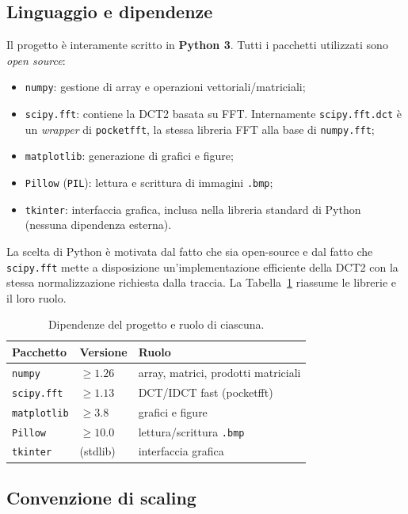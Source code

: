 \documentclass[11pt,a4paper]{article}
\begin{document}
\subsection{Linguaggio e dipendenze}\label{sec:intro}

Il progetto è interamente scritto in \textbf{Python 3}. Tutti i pacchetti
utilizzati sono \emph{open source}:
\begin{itemize}
  \item \texttt{numpy}: gestione di array e operazioni vettoriali/matriciali;
  \item \texttt{scipy.fft}: contiene la DCT2 basata su FFT. Internamente
        \texttt{scipy.fft.dct} è un \emph{wrapper} di \texttt{pocketfft}, la
        stessa libreria FFT alla base di \texttt{numpy.fft};
  \item \texttt{matplotlib}: generazione di grafici e figure;
  \item \texttt{Pillow} (\texttt{PIL}): lettura e scrittura di immagini
        \texttt{.bmp};
  \item \texttt{tkinter}: interfaccia grafica, inclusa nella libreria standard
        di Python (nessuna dipendenza esterna).
\end{itemize}

La scelta di Python è motivata dal fatto che sia open-source e dal fatto che
\texttt{scipy.fft} mette a disposizione un'implementazione efficiente della DCT2
con la stessa normalizzazione richiesta dalla traccia. La
Tabella~\ref{tab:dipendenze} riassume le librerie e il loro ruolo.

\begin{table}[H]
\centering
\caption{Dipendenze del progetto e ruolo di ciascuna.}
\label{tab:dipendenze}
\begin{tabular}{lll}
\toprule
Pacchetto & Versione & Ruolo \\
\midrule
\texttt{numpy}      & $\ge 1.26$ & array, matrici, prodotti matriciali \\
\texttt{scipy.fft}  & $\ge 1.13$ & DCT/IDCT fast (pocketfft) \\
\texttt{matplotlib} & $\ge 3.8$  & grafici e figure \\
\texttt{Pillow}     & $\ge 10.0$ & lettura/scrittura \texttt{.bmp} \\
\texttt{tkinter}    & (stdlib)   & interfaccia grafica \\
\bottomrule
\end{tabular}
\end{table}

\subsection{Convenzione di scaling}\label{sec:scaling}
\end{document}
